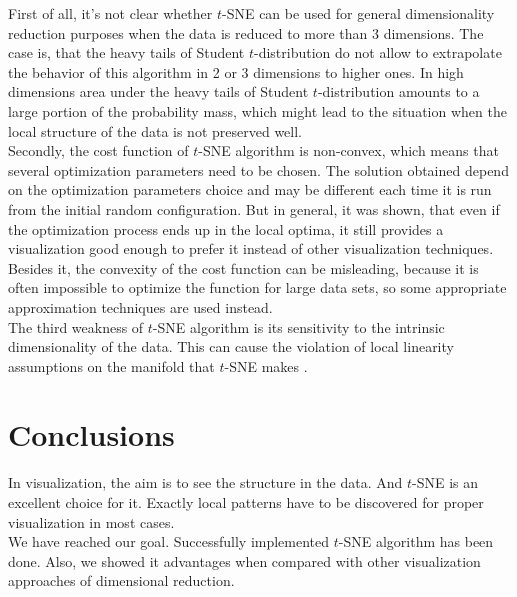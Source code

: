 First of all, it's not clear whether $t$-SNE can be used for general dimensionality reduction purposes when the data is reduced to more than 3 dimensions. The case is, that the heavy tails of Student $t$-distribution do not allow to extrapolate the behavior of this algorithm in 2 or 3 dimensions to higher ones. In high dimensions area under the heavy tails of Student $t$-distribution amounts to a large portion of the probability mass, which might lead to the situation when the local structure of the data is not preserved well. \\

Secondly, the cost function of $t$-SNE algorithm is non-convex, which means that several optimization parameters need to be chosen. The solution obtained depend on the optimization parameters choice and may be different each time it is run from the initial random configuration. But in general, it was shown, that even if the optimization process ends up in the local optima, it still provides a visualization good enough to prefer it instead of other visualization techniques. Besides it, the convexity of the cost function can be misleading, because it is often impossible to optimize the function for large data sets, so some appropriate approximation techniques are used instead. \\

The third weakness of $t$-SNE algorithm is its sensitivity to the intrinsic dimensionality of the data. This can cause the violation of local linearity assumptions on the manifold that $t$-SNE makes \cite{tsnearticle}.\\

\section{Conclusions}

In visualization, the aim is to see the structure in the data. And $t$-SNE is an excellent choice for it. Exactly local patterns have to be discovered for proper visualization in most cases.\\
We have reached our goal. Successfully implemented $t$-SNE algorithm has been done. Also, we showed it advantages when compared with other visualization approaches of dimensional reduction.

